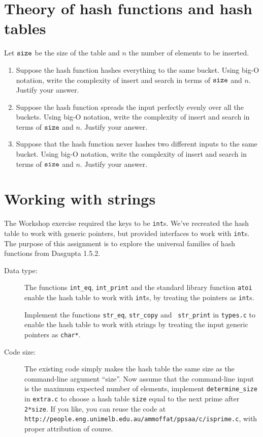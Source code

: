 \documentclass[11pt]{article}
\newcommand{\size}{{\tt size}}
\begin{document}
\section*{Theory of hash functions and hash tables}
Let $\size$ be the size of the table and $n$ the number of elements to be inserted.
\begin{enumerate}
        \item Suppose the hash function hashes everything to the same bucket.
            Using big-O notation, write the complexity of insert and search in
            terms of $\size$ and $n$.  Justify your answer.
        \item Suppose the hash function spreads the input perfectly evenly over
            all the buckets.  Using big-O notation, write the complexity of
            insert and search in terms of $\size$ and $n$.  Justify your
            answer.
        \item Suppose that the hash function never hashes two different inputs
            to the same bucket.  Using big-O notation, write the complexity of
            insert and search in terms of $\size$ and $n$.  Justify your
            answer.
      \end{enumerate}

\section*{Working with strings}
The Workshop exercise required the keys to be {\tt int}s. We've recreated the
hash table to work with generic pointers, but provided interfaces to work with
{\tt int}s. The purpose of this assignment is to explore the universal families
of hash functions from Dasgupta 1.5.2.

\begin{description}
    \item[Data type:] The functions {\tt int\_eq}, {\tt int\_print} and the
        standard library function {\tt atoi} enable the hash table to work
        with {\tt int}s, by treating the pointers as {\tt int}s.

        Implement the functions {\tt str\_eq}, {\tt str\_copy} and {\tt
        str\_print} in {\tt types.c} to enable the hash table to work with
        strings by treating the input generic pointers as {\tt char*}.

    \item[Code size:]
        The existing code simply makes the hash table the same size as the command-line argument ``size''.
        Now assume that the command-line input is the maximum expected number of elements,
        implement {\tt determine\_size} in {\tt extra.c} to choose a hash table {\tt size}
        equal to the next prime after {\tt 2*size}.
        If you like, you can reuse the code at
        {\tt http://people.eng.unimelb.edu.au/ammoffat/ppsaa/c/isprime.c},
        with proper attribution of course.
\end{description}
\end{document}
